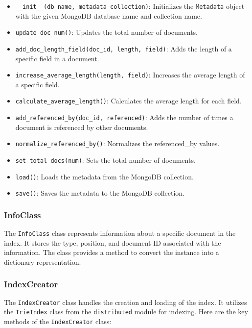 \documentclass{article}
\begin{document}
\begin{itemize}
    \item \texttt{\_\_init\_\_(db\_name, metadata\_collection)}: 
    Initializes the \texttt{Metadata} object with the given MongoDB database name and collection name.
    \item \texttt{update\_doc\_num()}: Updates the total number of documents.
    \item \texttt{add\_doc\_length\_field(doc\_id, length, field)}: Adds the length of a 
    specific field in a document.
    \item \texttt{increase\_average\_length(length, field)}: Increases the average length of a 
    specific field.
    \item \texttt{calculate\_average\_length()}: Calculates the average length for each field.
    \item \texttt{add\_referenced\_by(doc\_id, referenced)}: Adds the number of times a document 
    is referenced by other documents.
    \item \texttt{normalize\_referenced\_by()}: Normalizes the referenced\_by values.
    \item \texttt{set\_total\_docs(num)}: Sets the total number of documents.
    \item \texttt{load()}: Loads the metadata from the MongoDB collection.
    \item \texttt{save()}: Saves the metadata to the MongoDB collection.
\end{itemize}

\subsubsection{InfoClass}

The \texttt{InfoClass} class represents information about a specific document in the index. It 
stores the type, position, and document ID associated with the information. The class provides a 
method to convert the instance into a dictionary representation.

\subsubsection{IndexCreator}

The \texttt{IndexCreator} class handles the creation and loading of the index. It utilizes the 
\texttt{TrieIndex} class from the \texttt{distributed} module for indexing. Here are the key 
methods of the \texttt{IndexCreator} class:
\end{document}
